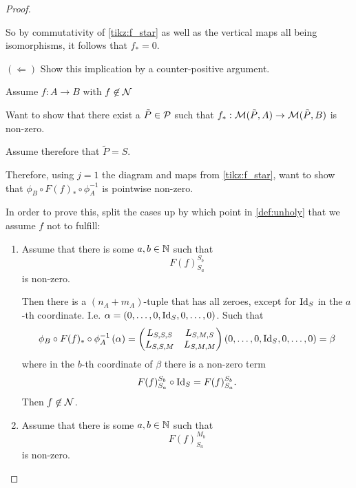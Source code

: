 \begin{proof}
\begin{enumerate}
{            So by commutativity of \autoref{tikz:f_star} as well as the vertical maps all being isomorphisms, it follows that \( f_* = 0 \).

            \( ( \Leftarrow ) \) Show this implication by a counter-positive argument.

            Assume \( f: A \to B \) with \( f \not\in {\mathcal{N}} \)

            Want to show that there exist a \( \tilde{P} \in {\mathcal{P}} \) such that \( f_*: {\mathcal{M}}(\tilde{P}, A) \to {\mathcal{M}}(\tilde{P}, B)\) is non-zero.

            Assume therefore that \( \tilde{P} = S \).

            Therefore, using \( j = 1 \) the diagram and maps from \autoref{tikz:f_star}, want to show that \( \phi_B \circ F(f)_* \circ \phi_A^{-1} \) is pointwise non-zero.

            In order to prove this, split the cases up by which point in \autoref{def:unholy} that we assume \( f \) not to fulfill:
            \begin{enumerate}
                \item {
                    Assume that there is some \( a, b \in {\mathbb{N}} \) such that
                    \[
                        F(f)_{S_a}^{S_b}
                    \]
                    is non-zero.

                    Then there is a \( (n_A + m_A) \)-tuple that has all zeroes, except for \( \operatorname{Id}_S \) in the \( a \)-th coordinate. I.e. \( \alpha = \left( 0, \dots, 0, \operatorname{Id}_S, 0, \dots, 0 \right) \). Such that
                    \[
                        \phi_B \circ F(f)_* \circ \phi_A^{-1} \left( \alpha \right)
                        =
                        \begin{pmatrix}
                            L_{S, S, S} & L_{S, M, S} \\
                            L_{S, S, M} & L_{S, M, M}
                        \end{pmatrix}
                        \left( 0, \dots, 0, \operatorname{Id}_S, 0, \dots, 0 \right)
                        = \beta
                    \]
                    where in the \( b \)-th coordinate of \( \beta \) there is a non-zero term
                    \[
                        F(f)_{S_a}^{S_b} \circ \operatorname{Id}_S = F(f)_{S_a}^{S_b}.
                    \]
                    Then \( f \not\in {\mathcal{N}} \). 
                }
                \item {
                    Assume that there is some \( a, b \in {\mathbb{N}} \) such that
                    \[
                        F(f)_{S_a}^{M_b}
                    \]
                    is non-zero.

}
\end{enumerate}}
\end{enumerate}
\end{proof}
